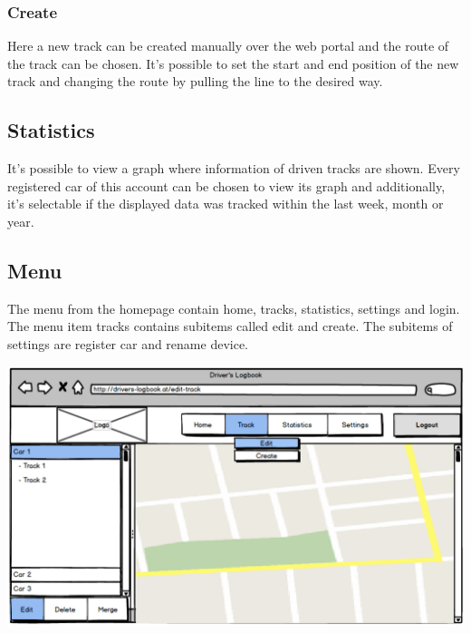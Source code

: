 \subsubsection{Create}
Here a new track can be created manually over the web portal and the route of the track can be chosen. It’s possible to set the start and end position of the new track and changing the route by pulling the line to the desired way.
\subsection{Statistics}
It’s possible to view a graph where information of driven tracks are shown. Every registered car of this account can be chosen to view its graph and additionally, it’s selectable if the displayed data was tracked within the last week, month or year.
\subsection{Menu}
The menu from the homepage contain home, tracks, statistics, settings and login. The menu item tracks contains subitems called edit and create. The subitems of settings are register car and rename device.

\begin{center}
\includegraphics[width=1\textwidth]{bilder/WebPortal}
\end{center}
\clearpageauthor
\newpage
{}
